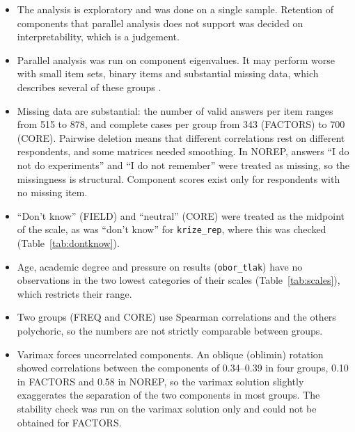 \documentclass[11pt,a4paper]{article}
\newcommand{\var}[1]{\texttt{#1}}
\begin{document}
\begin{itemize}
\item The analysis is exploratory and was done on a single sample. Retention of components that parallel analysis does not support was decided on interpretability, which is a judgement.
\item Parallel analysis was run on component eigenvalues. It may perform worse with small item sets, binary items and substantial missing data, which describes several of these groups \citep{tran2009}.
\item Missing data are substantial: the number of valid answers per item ranges from 515 to 878, and complete cases per group from 343 (FACTORS) to 700 (CORE). Pairwise deletion means that different correlations rest on different respondents, and some matrices needed smoothing. In NOREP, answers ``I do not do experiments'' and ``I do not remember'' were treated as missing, so the missingness is structural. Component scores exist only for respondents with no missing item.
\item ``Don't know'' (FIELD) and ``neutral'' (CORE) were treated as the midpoint of the scale, as was ``don't know'' for \var{krize\_rep}, where this was checked (Table~\ref{tab:dontknow}).
\item Age, academic degree and pressure on results (\var{obor\_tlak}) have no observations in the two lowest categories of their scales (Table~\ref{tab:scales}), which restricts their range.
\item Two groups (FREQ and CORE) use Spearman correlations and the others polychoric, so the numbers are not strictly comparable between groups.
\item Varimax forces uncorrelated components. An oblique (oblimin) rotation showed correlations between the components of 0.34--0.39 in four groups, 0.10 in FACTORS and 0.58 in NOREP, so the varimax solution slightly exaggerates the separation of the two components in most groups. The stability check was run on the varimax solution only and could not be obtained for FACTORS.
\end{itemize}

\end{document}
